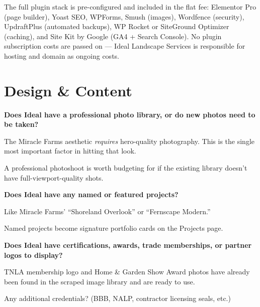 \documentclass[11pt, letterpaper]{article}
\begin{document}
\begin{notebox}
\small The full plugin stack is pre-configured and included in the flat fee:
Elementor Pro (page builder), Yoast SEO, WPForms, Smush (images), Wordfence
(security), UpdraftPlus (automated backups), WP Rocket or SiteGround Optimizer
(caching), and Site Kit by Google (GA4 + Search Console). No plugin subscription
costs are passed on --- Ideal Landscape Services is responsible for hosting
and domain as ongoing costs.
\end{notebox}

\section{Design \& Content}

\begin{checklist}
  \item \textbf{Does Ideal have a professional photo library, or do new photos
        need to be taken?}
    \begin{checklist}
      \item The Miracle Farms aesthetic \emph{requires} hero-quality photography.
            This is the single most important factor in hitting that look.
      \item A professional photoshoot is worth budgeting for if the existing
            library doesn't have full-viewport-quality shots.
    \end{checklist}

  \item \textbf{Does Ideal have any named or featured projects?}
    \begin{checklist}
      \item Like Miracle Farms' ``Shoreland Overlook'' or ``Fernscape Modern.''
      \item Named projects become signature portfolio cards on the Projects page.
    \end{checklist}

  \item \textbf{Does Ideal have certifications, awards, trade memberships, or
        partner logos to display?}
    \begin{checklist}
      \item TNLA membership logo and Home \& Garden Show Award photos have already
            been found in the scraped image library and are ready to use.
      \item Any additional credentials? (BBB, NALP, contractor licensing seals, etc.)
    \end{checklist}
\end{checklist}
\end{document}
